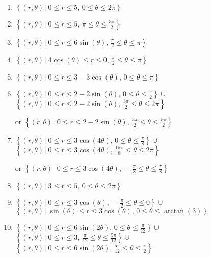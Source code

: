\begin{enumerate}

\setcounter{enumi}{\value{HW}}

\item $\left\{ (r,\theta) \, | \, 0 \leq r \leq 5, \, 0\leq \theta \leq 2\pi \right\}$
\item $\left\{ (r,\theta) \, | \, 0 \leq r \leq 5, \, \pi \leq \theta \leq \frac{3\pi}{2} \right\}$
\item $\left\{ (r,\theta) \, | \, 0 \leq r \leq 6\sin(\theta), \, \frac{\pi}{2} \leq \theta \leq \pi \right\}$
\item $\left\{ (r,\theta) \, | \, 4\cos(\theta) \leq r \leq 0, \, \frac{\pi}{2} \leq \theta \leq \pi \right\}$
\item $\left\{ (r,\theta) \, | \, 0 \leq r \leq 3 - 3\cos(\theta), \, 0 \leq \theta \leq \pi \right\}$
\item $\left\{ (r,\theta) \, | \, 0 \leq r \leq 2-2\sin(\theta), \, 0 \leq \theta \leq \frac{\pi}{2}  \right\} \cup$ 
$\left\{ (r,\theta) \, | \, 0 \leq r \leq  2-2\sin(\theta), \, \frac{3\pi}{2} \leq \theta \leq 2\pi  \right\}$

or  $\left\{ (r,\theta) \, | \, 0 \leq r \leq 2-2\sin(\theta), \, \frac{3\pi}{2} \leq \theta \leq \frac{5\pi}{2}  \right\}$
 
\item $\left\{ (r,\theta) \, | \, 0 \leq r \leq 3\cos(4\theta), \,0 \leq \theta \leq \frac{\pi}{8} \right\} \cup$ $\left\{ (r,\theta) \, | \, 0 \leq r \leq 3\cos(4\theta), \,\frac{15\pi}{8} \leq \theta \leq 2\pi \right\}$  

or $\left\{ (r,\theta) \, | \, 0 \leq r \leq 3\cos(4\theta), \, -\frac{\pi}{8} \leq \theta \leq \frac{\pi}{8} \right\}$

\item   $\left\{ (r,\theta) \, | \, 3 \leq r \leq 5, \, 0 \leq \theta \leq 2\pi \right\}$

\item $\left\{ (r,\theta) \, | \, 0 \leq r \leq 3\cos(\theta), \, -\frac{\pi}{2} \leq \theta \leq 0 \right\} \cup$ 
$\left\{ (r,\theta) \, | \, \sin(\theta) \leq r \leq 3\cos(\theta), \, 0 \leq \theta \leq \arctan(3) \right\}$

\item  $\left\{ (r,\theta) \, | \, 0 \leq r \leq 6\sin(2\theta), \,0 \leq \theta \leq \frac{\pi}{12} \right\} \cup$ $\left\{ (r,\theta) \, | \, 0 \leq r \leq 3, \,\frac{\pi}{12} \leq \theta \leq \frac{5\pi}{12} \right\} \cup$ \\ $\left\{ (r,\theta) \, | \, 0 \leq r \leq 6\sin(2\theta), \, \frac{5\pi}{12} \leq \theta \leq \frac{\pi}{2} \right\}$

\end{enumerate}



\closegraphsfile